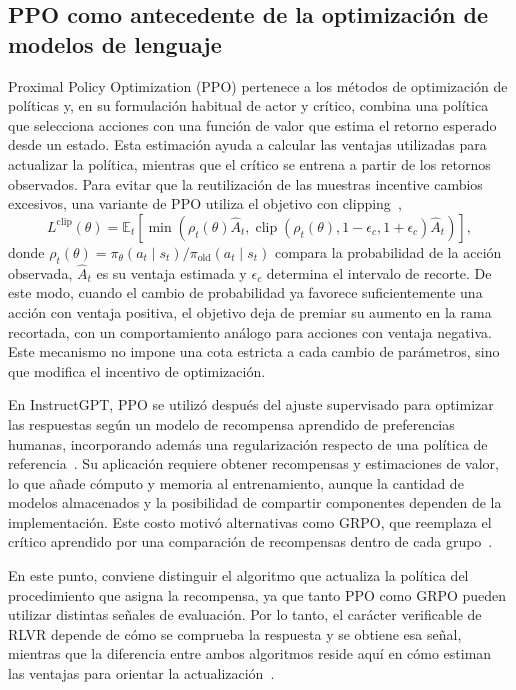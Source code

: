 \subsection{PPO como antecedente de la optimización de modelos de lenguaje}
\label{sec:ppo}
Proximal Policy Optimization (PPO) pertenece a los métodos de optimización de políticas y, en su formulación habitual de actor y crítico, combina una política que selecciona acciones con una función de valor que estima el retorno esperado desde un estado. Esta estimación ayuda a calcular las ventajas utilizadas para actualizar la política, mientras que el crítico se entrena a partir de los retornos observados. Para evitar que la reutilización de las muestras incentive cambios excesivos, una variante de PPO utiliza el objetivo con clipping~\cite{schulman2017ppo},
\begin{equation}
L^{\mathrm{clip}}(\theta)=\mathbb{E}_{t}\!\left[
\min\left(\rho_t(\theta)\widehat{A}_t,
\operatorname{clip}(\rho_t(\theta),1-\epsilon_c,1+\epsilon_c)\widehat{A}_t\right)
\right],
\label{eq:ppo}
\end{equation}
donde $\rho_t(\theta)=\pi_\theta(a_t\mid s_t)/\pi_{\mathrm{old}}(a_t\mid s_t)$ compara la probabilidad de la acción observada, $\widehat{A}_t$ es su ventaja estimada y $\epsilon_c$ determina el intervalo de recorte. De este modo, cuando el cambio de probabilidad ya favorece suficientemente una acción con ventaja positiva, el objetivo deja de premiar su aumento en la rama recortada, con un comportamiento análogo para acciones con ventaja negativa. Este mecanismo no impone una cota estricta a cada cambio de parámetros, sino que modifica el incentivo de optimización.

En InstructGPT, PPO se utilizó después del ajuste supervisado para optimizar las respuestas según un modelo de recompensa aprendido de preferencias humanas, incorporando además una regularización respecto de una política de referencia~\cite{ouyang2022instructgpt}. Su aplicación requiere obtener recompensas y estimaciones de valor, lo que añade cómputo y memoria al entrenamiento, aunque la cantidad de modelos almacenados y la posibilidad de compartir componentes dependen de la implementación. Este costo motivó alternativas como GRPO, que reemplaza el crítico aprendido por una comparación de recompensas dentro de cada grupo~\cite{shao2024deepseekmath}.

En este punto, conviene distinguir el algoritmo que actualiza la política del procedimiento que asigna la recompensa, ya que tanto PPO como GRPO pueden utilizar distintas señales de evaluación. Por lo tanto, el carácter verificable de RLVR depende de cómo se comprueba la respuesta y se obtiene esa señal, mientras que la diferencia entre ambos algoritmos reside aquí en cómo estiman las ventajas para orientar la actualización~\cite{schulman2017ppo,shao2024deepseekmath,deepseek2025r1}.
